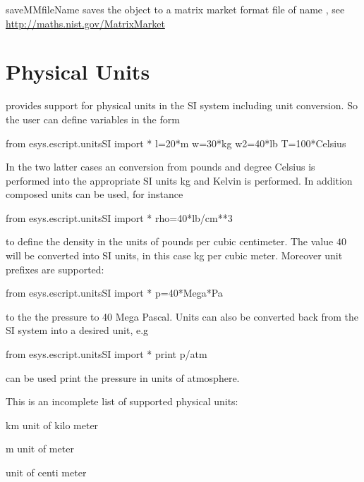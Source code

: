\begin{methoddesc}[Operator]{saveMM}{fileName}
saves the object to a matrix market format file of name
, see
\url{http://maths.nist.gov/MatrixMarket}
\end{methoddesc}

\section{Physical Units}
\escript provides support for physical units in the SI system  including unit conversion. So the
user can define variables in the form
\begin{python}
from esys.escript.unitsSI import *
l=20*m
w=30*kg
w2=40*lb
T=100*Celsius
\end{python}
In the two latter cases an conversion from pounds and degree Celsius is performed into the appropriate SI units kg and Kelvin is performed. In addition 
composed units can be used, for instance
\begin{python}
from esys.escript.unitsSI import *
rho=40*lb/cm**3
\end{python}
to define the density in the units of pounds per cubic centimeter. The value $40$ will be converted 
into SI units, in this case kg per cubic meter.
Moreover unit prefixes are supported:
\begin{python}
from esys.escript.unitsSI import *
p=40*Mega*Pa
\end{python}
to the the pressure to 40 Mega Pascal. Units can also be converted back from the SI system into
a desired unit, e.g
\begin{python}
from esys.escript.unitsSI import *
print p/atm
\end{python}
can be used print the pressure in units of atmosphere.  

This is an incomplete list of supported physical units:

\begin{datadesc}{km}
unit of kilo meter
\end{datadesc}

\begin{datadesc}{m}
unit of meter
\end{datadesc}

\begin{datadesc}{cm}
unit of centi meter
\end{datadesc}

